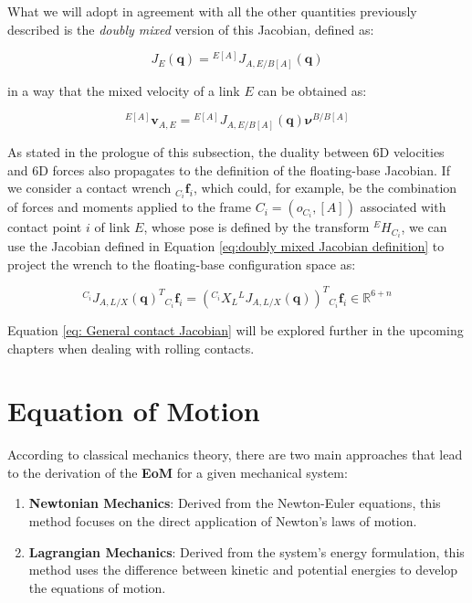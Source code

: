     What we will adopt in agreement with all the other quantities previously described is the \textit{doubly mixed} version of this Jacobian, defined as:

    \begin{equation}
        J_E( \mathbf{q}) = {}^{E[A]}J_{A,E/B[A]}( \mathbf{q})
    \label{eq:doubly mixed Jacobian definition}
    \end{equation}

    in a way that the mixed velocity of a link $E$ can be obtained as:

    \begin{equation}
        {}^{E[A]} \mathbf{v}_{A,E} = {}^{E[A]}J_{A,E/B[A]}( \mathbf{q})\bm{\nu}^{B/B[A]}
    \end{equation}

    As stated in the prologue of this subsection, the duality between 6D velocities and 6D forces also propagates to the definition of the floating-base Jacobian. 
    If we consider a contact wrench ${}_{C_i} \mathbf{f}_{i}$, which could, for example, be the combination of forces and moments applied to the frame $C_i = (o_{C_i}, [A])$ associated with contact point $i$ of link $E$, whose pose is defined by the transform ${}^{E}H_{C_i}$, we can use the Jacobian defined in Equation \eqref{eq:doubly mixed Jacobian definition} to project the wrench to the floating-base configuration space as:

    \begin{equation}
        {}^{C_i} J_{A,L/X}( \mathbf{q})^{T} {}_{C_i} \mathbf{f}_i = ({}^{C_i}X_{L} {}^{L}J_{A,L/X}( \mathbf{q}))^{T} {}_{C_i} \mathbf{f}_i \in \mathbb{R}^{6+n}
    \label{eq: General contact Jacobian}
    \end{equation}
    
   Equation \eqref{eq: General contact Jacobian} will be explored further in the upcoming chapters when dealing with rolling contacts.



    \section{Equation of Motion}
    \label{sec: Equation of Motion}

    According to classical mechanics theory, there are two main approaches that lead to the derivation of the \textbf{EoM} for a given mechanical system:
    
    \begin{enumerate}
    \item \textbf{Newtonian Mechanics}: Derived from the Newton-Euler equations, this method focuses on the direct application of Newton's laws of motion.
    \item \textbf{Lagrangian Mechanics}: Derived from the system's energy formulation, this method uses the difference between kinetic and potential energies to develop the equations of motion.
    \end{enumerate}
    

